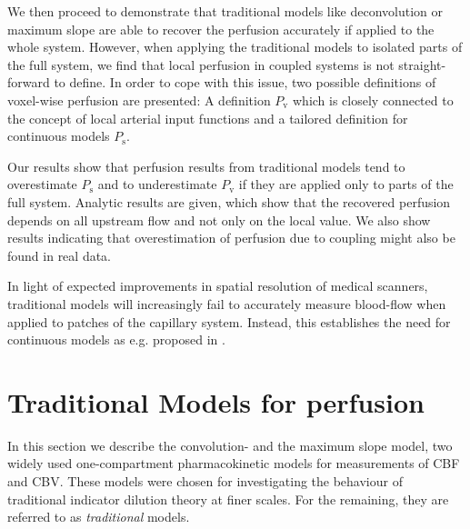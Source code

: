 \documentclass[journal,twocolumn]{IEEEtran}
\newcommand{\Perfv}{P_{\mathrm{v}}}
\newcommand{\Perfs}{P_{\mathrm{s}}}
\begin{document}
	We then proceed to demonstrate that traditional models like deconvolution or maximum slope are able to recover the perfusion accurately if applied to the whole system.
	However, when applying the traditional models to isolated parts of the full system, we find that local perfusion in coupled systems is not straight-forward to define.
	In order to cope with this issue, two possible definitions of voxel-wise perfusion are presented: A definition $\Perfv$ which is closely connected to the concept of local arterial input functions and a tailored definition for continuous models $\Perfs$.
	
	Our results show that perfusion results from traditional models tend to overestimate $\Perfs$ and to underestimate $\Perfv$ if they are applied only to parts of the full system.
	Analytic results are given, which show that the recovered perfusion depends on all upstream flow and not only on the local value.
	We also show results indicating that overestimation of perfusion due to coupling might also be found in real data.
	
In light of expected improvements in spatial resolution of medical scanners, traditional models will increasingly fail to accurately measure blood-flow when applied to patches of the capillary system. Instead, this establishes the need for continuous models as e.g. proposed in \cite{sourbron14}.
	
	
	\section{Traditional Models for perfusion} \label{sec:traditional}

	In this section we describe  the convolution- and the maximum slope model, two widely used one-compartment pharmacokinetic models for measurements of CBF and CBV. These models were chosen for investigating the behaviour of traditional indicator dilution theory at finer scales. For the remaining, they are referred to as \emph{traditional} models.
	
\end{document}
